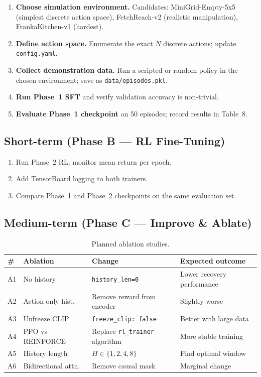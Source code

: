 \documentclass[12pt, a4paper]{article}
\begin{document}
\begin{enumerate}[leftmargin=1.5em]
  \item \textbf{Choose simulation environment.}
        Candidates: MiniGrid-Empty-5x5 (simplest discrete action space),
        FetchReach-v2 (realistic manipulation), FrankaKitchen-v1 (hardest).
  \item \textbf{Define action space.}
        Enumerate the exact $N$ discrete actions; update \texttt{config.yaml}.
  \item \textbf{Collect demonstration data.}
        Run a scripted or random policy in the chosen environment;
        save as \texttt{data/episodes.pkl}.
  \item \textbf{Run Phase~1 SFT} and verify validation accuracy is non-trivial.
  \item \textbf{Evaluate Phase~1 checkpoint} on 50 episodes; record results in
        Table~8.
\end{enumerate}

\subsection{Short-term (Phase B — RL Fine-Tuning)}

\begin{enumerate}[leftmargin=1.5em]
  \item Run Phase~2 RL; monitor mean return per epoch.
  \item Add TensorBoard logging to both trainers.
  \item Compare Phase~1 and Phase~2 checkpoints on the same evaluation set.
\end{enumerate}

\subsection{Medium-term (Phase C — Improve \& Ablate)}

\begin{table}[h]
\centering
\caption{Planned ablation studies.}
\begin{tabular}{C{0.8cm} L{3.5cm} L{5cm} L{4cm}}
\toprule
\textbf{\#} & \textbf{Ablation} & \textbf{Change} & \textbf{Expected outcome} \\
\midrule
A1 & No history        & \texttt{history\_len=0}               & Lower recovery performance \\
A2 & Action-only hist. & Remove reward from encoder            & Slightly worse \\
A3 & Unfreeze CLIP     & \texttt{freeze\_clip: false}          & Better with large data \\
A4 & PPO vs REINFORCE  & Replace \texttt{rl\_trainer} algorithm & More stable training \\
A5 & History length    & $H \in \{1,2,4,8\}$                  & Find optimal window \\
A6 & Bidirectional attn. & Remove causal mask                  & Marginal change \\
\bottomrule
\end{tabular}
\end{table}
\end{document}
